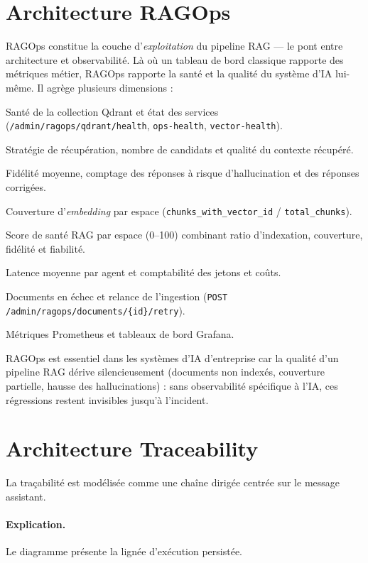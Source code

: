 \section{Architecture RAGOps}
RAGOps constitue la couche d'\emph{exploitation} du pipeline RAG — le pont entre
architecture et observabilité. Là où un tableau de bord classique rapporte des
métriques métier, RAGOps rapporte la santé et la qualité du système d'IA lui-même.
Il agrège plusieurs dimensions :

\begin{description}[leftmargin=2.6cm,style=nextline]
\item[Health Monitoring] Santé de la collection Qdrant et état des services
(\texttt{/admin/ragops/qdrant/health}, \texttt{ops-health}, \texttt{vector-health}).
\item[Retrieval Analytics] Stratégie de récupération, nombre de candidats et
qualité du contexte récupéré.
\item[Evaluation Intelligence] Fidélité moyenne, comptage des réponses à risque
d'hallucination et des réponses corrigées.
\item[Embedding Analytics] Couverture d'\emph{embedding} par espace
(\texttt{chunks\_with\_vector\_id} / \texttt{total\_chunks}).
\item[Workspace Health] Score de santé RAG par espace (0--100) combinant ratio
d'indexation, couverture, fidélité et fiabilité.
\item[Agent Monitoring] Latence moyenne par agent et comptabilité des jetons et
coûts.
\item[Failure Center] Documents en échec et relance de l'ingestion
(\texttt{POST /admin/ragops/documents/\{id\}/retry}).
\item[Observability] Métriques Prometheus et tableaux de bord Grafana.
\end{description}

RAGOps est essentiel dans les systèmes d'IA d'entreprise car la qualité d'un
pipeline RAG dérive silencieusement (documents non indexés, couverture partielle,
hausse des hallucinations) : sans observabilité spécifique à l'IA, ces régressions
restent invisibles jusqu'à l'incident.

\section{Architecture Traceability}
La traçabilité est modélisée comme une chaîne dirigée centrée sur le message
assistant.

\paragraph{Explication.} Le diagramme présente la lignée d'exécution persistée.
